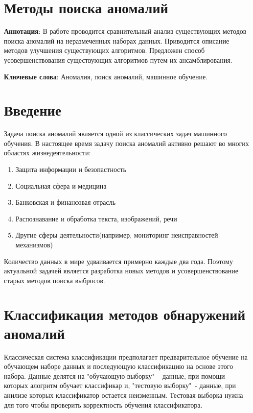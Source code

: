 \section*{Методы поиска аномалий}
\label{cha:analysis}
\textbf{Аннотация}: В работе проводится сравнительный анализ существующих методов поиска аномалий на неразмеченных наборах данных. Приводится описание методов улучшения   существующих алгоритмов. Предложен способ усовершенствования существующих алгоритмов путем их ансамблирования.

\textbf{Ключевые слова}: Аномалия, поиск аномалий, машинное обучение.
\section{Введение} 
Задача поиска аномалий является одной из классических задач машинного обучения. В настоящее время задачу поиска аномалий активно решают во многих областях жизнедеятельности:
\begin{enumerate} 
	\item Защита информации и безопастность
	\item Социальная сфера и медицина
	\item Банковская и финансовая отрасль
	\item Распознавание и обработка текста, изображений, речи
	\item Другие сферы деятельности(например, мониторинг неисправностей механизмов)
\end{enumerate} 

Количество данных в мире удваивается примерно каждые два года. Поэтому актуальной задачей является разработка новых методов и усовершенствование старых методов поиска выбросов.

\section{Классификация методов обнаружений аномалий}
Классическая система классификации предполагает предварительное обучение на обучающем наборе данных и последующую классификацию на основе этого набора. Данные делятся на "обучающую выборку"\ - данные, при помощи которых алогритм обучает классификар и, "тестовую выборку"\ - данные, при анилизе которых классификатор остается неизменным. Тестовая выборка нужна для того чтобы проверить корректность обучения классификатора.

